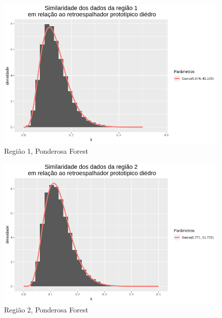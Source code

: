 \documentclass[12pt]{article}
\begin{document}
\begin{figure}[!h]
    \centering
    \vspace{0.1\linewidth}
    \includegraphics[width = \linewidth]{../../Images/Report_18_12_20/ponder_di_region1.png}
    \caption{Região 1, Ponderosa Forest}
    \label{fig:pond_di_r1}
\end{figure}

\begin{figure}[!h]
    \centering
    \vspace{0.08\linewidth}
    \includegraphics[width = \linewidth]{../../Images/Report_18_12_20/ponder_di_region2.png}
    \caption{Região 2, Ponderosa Forest}
    \label{fig:pond_di_r2}
\end{figure}
\end{document}

